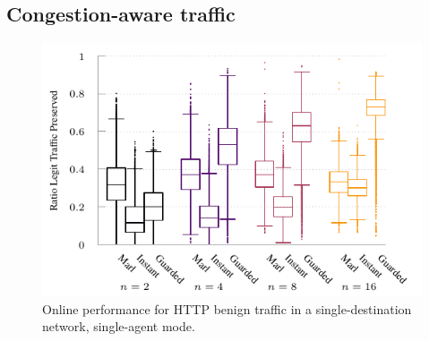 \documentclass[10pt, times, conference, letterpaper]{IEEEtran}
\begin{document}
\subsection{Congestion-aware traffic}
%	
\begin{figure}
	\centering
	\includegraphics[width=0.75\linewidth]{../plots/tnsm-tcp-box-single}
	\vspace{-1em}
	\caption{
		Online performance for HTTP benign traffic in a single-destination network, single-agent mode.
		\label{fig:tcp-tree-box}
	}
\vspace{-1em}
\end{figure}
%	
\end{document}
